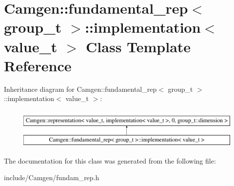 \hypertarget{a00292}{}\section{Camgen\+:\+:fundamental\+\_\+rep$<$ group\+\_\+t $>$\+:\+:implementation$<$ value\+\_\+t $>$ Class Template Reference}
\label{a00292}
Inheritance diagram for Camgen\+:\+:fundamental\+\_\+rep$<$ group\+\_\+t $>$\+:\+:implementation$<$ value\+\_\+t $>$\+:\begin{figure}[H]
\begin{center}
\leavevmode
\includegraphics[height=2.000000cm]{a00292}
\end{center}
\end{figure}


The documentation for this class was generated from the following file\+:\begin{DoxyCompactItemize}
\item 
include/\+Camgen/fundam\+\_\+rep.\+h\end{DoxyCompactItemize}
